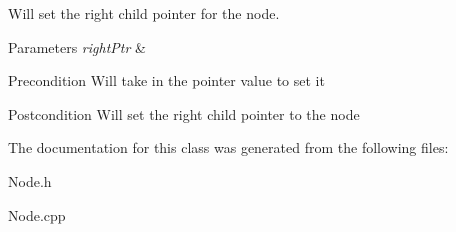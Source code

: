 Will set the right child pointer for the node. 


\begin{DoxyParams}{Parameters}
{\em right\+Ptr} & \\
\hline
\end{DoxyParams}
\begin{DoxyPrecond}{Precondition}
Will take in the pointer value to set it 
\end{DoxyPrecond}
\begin{DoxyPostcond}{Postcondition}
Will set the right child pointer to the node 
\end{DoxyPostcond}


The documentation for this class was generated from the following files\+:\begin{DoxyCompactItemize}
\item 
Node.\+h\item 
Node.\+cpp\end{DoxyCompactItemize}
